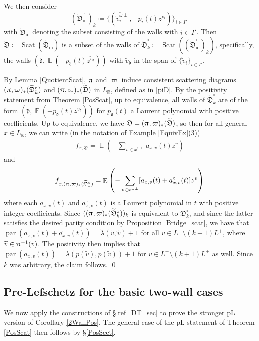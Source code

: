 \documentclass{amsart}
\DeclareMathOperator{\parit}{par}
\DeclareMathOperator{\In}{in}
\DeclareMathOperator{\EE}{\mathbb{E}}
\DeclareMathOperator{\scat}{Scat}
\let\bb=\mathbb
\let\f=\mathfrak
\let\wt=\widetilde
\renewcommand{\pi}{\uppi\hspace{0.05em}}
\theoremstyle{plain}%
\theoremstyle{definition}
\theoremstyle{remark}
\begin{document}
We then consider 
$$(\wt{\f{D}}^{\circ}_{\In})_k\coloneqq \{(\wt{v}_i^{\wt{\omega}\perp},-p_{i}(t)z^{\wt{v}_{i}})\}_{i\in I},$$
with $\wt{\f{D}}_{\In}$ denoting the subset consisting of the walls with $i\in I'$.  Then $\wt{\f{D}}\coloneqq \scat(\wt{\f{D}}_{\In})$ is a subset of the walls of $\wt{\f{D}}_k^{\circ}\coloneqq \scat((\wt{\f{D}}^{\circ}_{\In})_k)$, specifically, the walls $(\f{d},\EE(-p_{\f{d}}(t)z^{\wt{v}_{\f{d}}}))$ with $\wt{v}_{\f{d}}$ in the span of $\{\wt{v}_i\}_{i\in I'}$.  

By Lemma \ref{QuotientScat}, $\pi$ and $\varpi$ induce consistent scattering diagrams $(\pi,\varpi)_*(\wt{\f{D}}_k^{\circ})$ and $(\pi,\varpi)_*(\wt{\f{D}})$ in $L_{\bb{R}}$, defined as in \eqref{piD}.  By the positivity statement from Theorem \ref{PosScat}, up to equivalence, all walls of  $\wt{\f{D}}_k^{\circ}$ are of the form $(\f{d},\EE(-p_{\f{d}}(t)z^{\wt{v}_{\f{d}}}))$ for $p_{\f{d}}(t)$ a Laurent polynomial with positive coefficients.  Up to equivalence, we have $\f{D}=(\pi,\varpi)_*(\wt{\f{D}})$, so then for all general $x\in L_{\bb{R}}$, we can write (in the notation of Example \ref{EquivEx}(3))
\begin{align*}
f_{x,\f{D}}=\EE\left(-\sum_{v\in x^{\omega\perp}} a_{x,v}(t)z^v\right)
\end{align*}
    and
\begin{align*}
    f_{x,(\pi,\varpi)_*(\wt{\f{D}}_k^{\circ})}=\EE\left(-\sum_{v\in x^{\omega\perp}} [a_{x,v}(t)+a^{\circ}_{x,v}(t)]z^v \right)
\end{align*}
where each $a_{x,v}(t)$ and $a^{\circ}_{x,v}(t)$ is a Laurent polynomial in $t$ with positive integer coefficients.  Since $((\pi,\varpi)_*(\wt{\f{D}}_k^{\circ}))_k$ is equivalent to $\f{D}_k^{\circ}$, and since the latter satisfies the desired parity condition by Proposition \ref{Bridge_scat}, we have that $\parit(a_{x,v}(t)+a^{\circ}_{x,v}(t))=\wt{\lambda}(\wt{v},\wt{v})+1$ for all $v\in L^+\setminus (k+1)L^+$, where $\wt{v}\in \pi^{-1}(v)$.  The positivity then implies that $\parit(a_{x,v}(t))=\lambda(p(\wt{v}),p(\wt{v}))+1$ for $v\in L^+\setminus (k+1)L^+$ as well.  Since $k$ was arbitrary, the claim follows.
\qed


\subsection{Pre-Lefschetz for the basic two-wall cases}

We now apply the constructions of \S \ref{ref_DT_sec} to prove the stronger pL version of Corollary \ref{2WallPos}.  The general case of the pL statement of Theorem \ref{PosScat} then follows by \S \ref{PosSect}.
\end{document}
